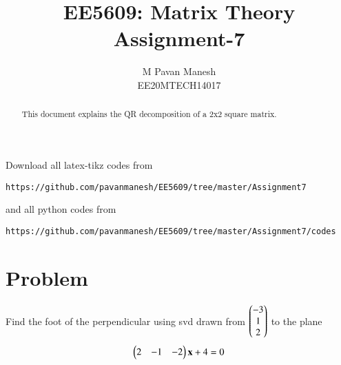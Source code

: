 \documentclass[journal,12pt,twocolumn]{IEEEtran}
\begin{document}
\makeatletter
{}
\makeatother
\let\StandardTheFigure\thefigure
\let\vec\mathbf
\renewcommand{\thefigure}{\theproblem}
\def\putbox#1#2#3{\makebox[0in][l]{\makebox[#1][l]{}\raisebox{\baselineskip}[0in][0in]{\raisebox{#2}[0in][0in]{#3}}}}
     \def\rightbox#1{\makebox[0in][r]{#1}}
     \def\centbox#1{\makebox[0in]{#1}}
     \def\topbox#1{\raisebox{-\baselineskip}[0in][0in]{#1}}
     \def\midbox#1{\raisebox{-0.5\baselineskip}[0in][0in]{#1}}
\vspace{3cm}
\title{EE5609: Matrix Theory\\
          Assignment-7\\}
\author{M Pavan Manesh\\
EE20MTECH14017 }
\maketitle
\newpage
\bigskip
\renewcommand{\thefigure}{\theenumi}
\renewcommand{\thetable}{\theenumi}
\begin{abstract}
This document explains the QR decomposition of a 2x2 square matrix.
\end{abstract}
Download all latex-tikz codes from 
%
\begin{lstlisting}
https://github.com/pavanmanesh/EE5609/tree/master/Assignment7
\end{lstlisting}
and all python codes from 
\begin{lstlisting}
https://github.com/pavanmanesh/EE5609/tree/master/Assignment7/codes
\end{lstlisting}
%
\section{Problem}
Find the foot of the perpendicular using svd drawn from $\begin{pmatrix}-3\\1\\2\end{pmatrix}$ to the plane
 \begin{align}
 \myvec{2&-1&-2}\vec{x}+4=0
 \end{align}
\end{document}

